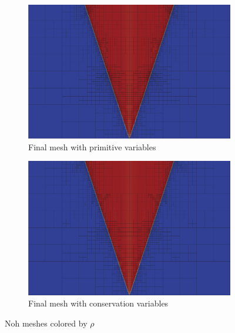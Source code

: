 \documentclass[Dissertation.tex]{subfiles}
\begin{document}
\begin{figure}[ht]
\centering
\begin{subfigure}[t]{0.9\textwidth}
\centering
\includegraphics[width=\textwidth]{Noh/FormulationComparison/Form0Mesh8.png}
\caption{Final mesh with primitive variables}
\end{subfigure}
\begin{subfigure}[t]{0.9\textwidth}
\centering
\includegraphics[width=\textwidth]{Noh/FormulationComparison/Form1Mesh8.png}
\caption{Final mesh with conservation variables}
\end{subfigure}
\caption{Noh meshes colored by $\rho$}
\label{fig:Noh}
\end{figure}
\end{document}
